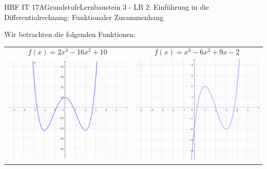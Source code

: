 \documentclass[oneside,openany,headings=optiontotoc,11pt,numbers=noenddot]{scrreprt}
\begin{document}
	\begin{worksheet}{HBF IT 17A}{Grundstufe}{Lernbaustein 3 - LB 2: Einführung in die Differentialrechnung: Funktionaler Zusammenhang}

		\begin{framed}
			\noindent
			Wir betrachten die folgenden Funktionen:\\\par\noindent
			\begin{tabularx}{\textwidth}{X|X}
				\[f(x) = 2x^4 -16x^2+10\] & \[f(x) = x^3 -6x^2 +9x -2\]\\
				\includegraphics[scale=0.3]{Bilder/fktZusammenhf.jpg} & \includegraphics[scale=0.3]{Bilder/fktZusammenhg.jpg}\\

\end{tabularx}
\end{framed}
\end{worksheet}
\end{document}
